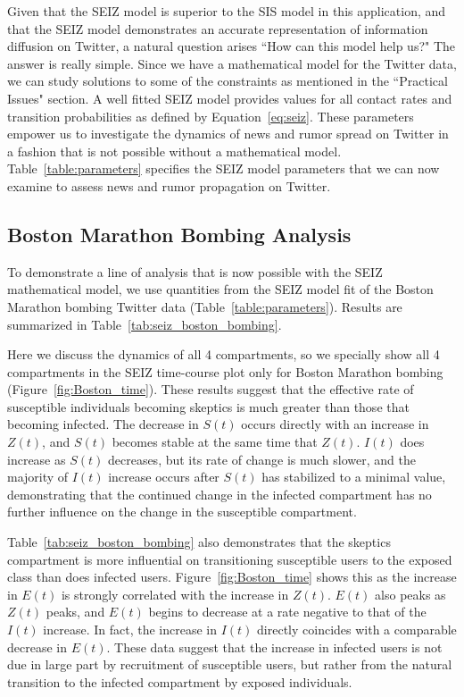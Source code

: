 Given that the SEIZ model is superior to the SIS model in this application, and that the SEIZ model demonstrates an accurate representation of information diffusion on Twitter, a natural question arises ``How can this model help us?" The answer is really simple. Since we have a mathematical model for the Twitter data, we can study solutions to some of the constraints as mentioned in the ``Practical Issues" section. A well fitted SEIZ model provides values for all contact rates and transition probabilities as defined by Equation~\ref{eq:seiz}. These parameters empower us to investigate the dynamics of news and rumor spread on Twitter in a fashion that is not possible without a mathematical model. Table~\ref{table:parameters} specifies the SEIZ model parameters that we can now examine to assess news and rumor propagation on Twitter.

\subsection{Boston Marathon Bombing Analysis}

To demonstrate a line of analysis that is now possible with the SEIZ mathematical model, we use quantities from the SEIZ model fit of the Boston Marathon bombing Twitter data (Table~\ref{table:parameters}). Results are summarized in Table~\ref{tab:seiz_boston_bombing}.

Here we discuss the dynamics of all 4 compartments, so we specially show all 4 compartments in the SEIZ time-course plot only for Boston Marathon bombing (Figure~\ref{fig:Boston_time}). These results suggest that the effective rate of susceptible individuals becoming skeptics is much greater than those that becoming infected. The decrease in $S(t)$ occurs directly with an increase in $Z(t)$, and $S(t)$ becomes stable at the same time that $Z(t)$. $I(t)$ does increase as $S(t)$ decreases, but its rate of change is much slower, and the majority of $I(t)$ increase occurs after $S(t)$ has stabilized to a minimal value, demonstrating that the continued change in the infected compartment has no further influence on the change in the susceptible compartment.

Table~\ref{tab:seiz_boston_bombing} also demonstrates that the skeptics compartment is more influential on transitioning susceptible users to the exposed class than does infected users. Figure~\ref{fig:Boston_time} shows this as the increase in $E(t)$ is strongly correlated with the increase in $Z(t)$. $E(t)$ also peaks as $Z(t)$ peaks, and $E(t)$ begins to decrease at a rate negative to that of the $I(t)$ increase. In fact, the increase in $I(t)$ directly coincides with a comparable decrease in $E(t)$. These data suggest that the increase in infected users is not due in large part by recruitment of susceptible users, but rather from the natural transition to the infected compartment by exposed individuals.

